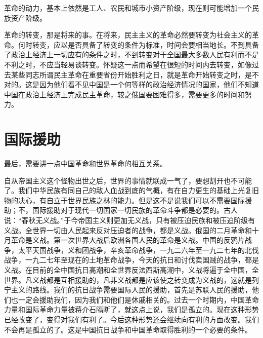 革命的动力，基本上依然是工人、农民和城市小资产阶级，现在则可能增加一个民族资产阶级。

革命的转变，那是将来的事。在将来，民主主义的革命必然要转变为社会主义的革命。何时转变，应以是否具备了转变的条件为标准，时间会要相当地长。不到具备了政治上经济上一切应有的条件之时，不到转变对于全国最大多数人民有利而不是不利之时，不应当轻易谈转变。怀疑这一点而希望在很短的时间内去转变，如像过去某些同志所谓民主革命在重要省份开始胜利之日，就是革命开始转变之时，是不对的。这是因为他们看不见中国是一个何等样的政治经济情况的国家，他们不知道中国在政治上经济上完成民主革命，较之俄国要困难得多，需要更多的时间和努力。

\section{国际援助}

最后，需要讲一点中国革命和世界革命的相互关系。

自从帝国主义这个怪物出世之后，世界的事情就联成一气了，要想割开也不可能了。我们中华民族有同自己的敌人血战到底的气概，有在自力更生的基础上光复旧物的决心，有自立于世界民族之林的能力。但是这不是说我们可以不需要国际援助；不，国际援助对于现代一切国家一切民族的革命斗争都是必要的。古人说：“春秋无义战。”于今帝国主义则更加无义战，只有被压迫民族和被压迫阶级有义战。全世界一切由人民起来反对压迫者的战争，都是义战。俄国的二月革命和十月革命是义战。第一次世界大战后欧洲各国人民的革命是义战。中国的反鸦片战争，太平天国战争，义和团战争，辛亥革命战争，一九二六年至一九二七年的北伐战争，一九二七年至现在的土地革命战争，今天的抗日和讨伐卖国贼的战争，都是义战。在目前的全中国抗日高潮和全世界反法西斯高潮中，义战将遍于全中国，全世界。凡义战都是互相援助的，凡非义战都是应该使之转变成为义战的，这就是列宁主义的路线。我们的抗日战争需要国际人民的援助，首先是苏联人民的援助，他们也一定会援助我们，因为我们和他们是休戚相关的。过去一个时期内，中国革命力量和国际革命力量被蒋介石隔断了，就这点上说，我们是孤立的。现在这种形势已经改变了，变得对我们有利了。今后这种形势还会继续向有利的方面改变。我们不会再是孤立的了。这是中国抗日战争和中国革命取得胜利的一个必要的条件。


